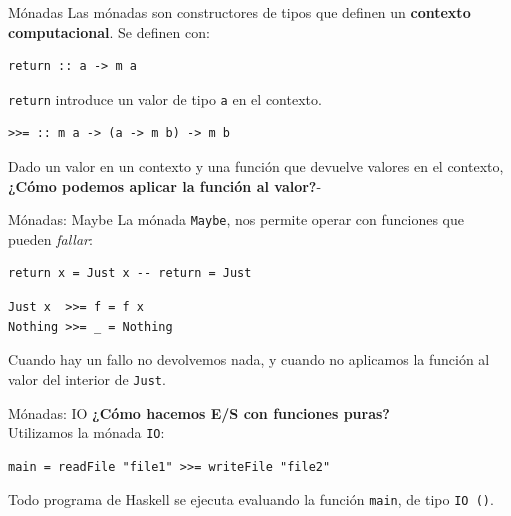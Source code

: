 \begin{frame}[fragile]{Mónadas}
Las mónadas son constructores de tipos que definen un \textbf{contexto computacional}.
Se definen con:

\espacio

\begin{lstlisting}
return :: a -> m a
\end{lstlisting}
\texttt{return} introduce un valor de tipo \texttt{a} en el contexto.

\espacio

\begin{lstlisting}
>>= :: m a -> (a -> m b) -> m b
\end{lstlisting}
Dado un valor en un contexto y una función que devuelve valores en el contexto,
\textbf{¿Cómo podemos aplicar la función al valor?}-
\end{frame}

\begin{frame}[fragile]{Mónadas: Maybe}
La mónada \texttt{Maybe}, nos permite operar con funciones que pueden \textit{fallar}:

\begin{lstlisting}
return x = Just x -- return = Just
\end{lstlisting}

\espacio

\begin{lstlisting}
Just x  >>= f = f x
Nothing >>= _ = Nothing
\end{lstlisting}
Cuando hay un fallo no devolvemos nada, y cuando no aplicamos la función al valor
del interior de \texttt{Just}.
\end{frame}

\begin{frame}[fragile]{Mónadas: IO}
\textbf{¿Cómo hacemos E/S con funciones puras?}\\
Utilizamos la mónada \texttt{IO}:

\espacio

\begin{lstlisting}
main = readFile "file1" >>= writeFile "file2"
\end{lstlisting}

\espacio

Todo programa de Haskell se ejecuta evaluando la función \texttt{main}, de tipo
\texttt{IO ()}.

\end{frame}
